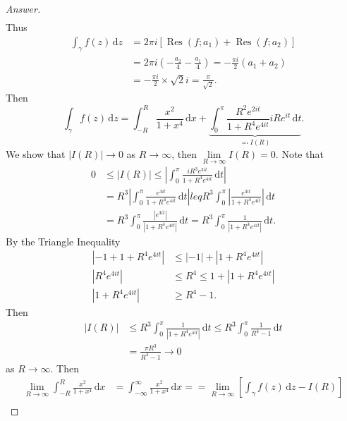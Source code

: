 \documentclass[12pt]{article}
\newcommand\paren[1]{\left( #1 \right)}
\newcommand{\sqbrack}[1]{\left [ #1 \right ]}
\theoremstyle{definition}
\DeclareMathOperator\Res{Res}
\begin{document}
\begin{enumerate}
\begin{proof}[Answer]
\begin{align*}
        \end{align*}
        Thus 
        \begin{align*}
            \int_{\gamma} f(z) \, \mathrm{d}z & = 2\pi i \sqbrack{ \Res(f;a_1) + \Res(f;a_2) } \\
            & = 2\pi i \paren{ -\frac{a_2}{4} - \frac{a_1}{4} } = -\frac{\pi i}{2}(a_1 + a_2) \\
            & = -\frac{\pi i}{2} \times \sqrt{2} i = \frac{\pi}{\sqrt{2}}.
        \end{align*}
        Then 
        \[
            \int_{\gamma} f(z) \, \mathrm{d}z = \int_{-R}^R \frac{x^2}{1+x^4} \, \mathrm{d}x + \underbrace{ \int_0^{\pi} \frac{ R^2 e^{2it} }{ 1 + R^4 e^{4it} } iRe^{it} \, \mathrm{d}t }_{ \eqqcolon I(R) }.
        \]
        We show that $|I(R)| \to 0$ as $R \to \infty$, then $\lim\limits_{R \to \infty} I(R) = 0$. Note that 
        \begin{align*}
            0 & \leq |I(R)| \leq \left| \int_0^{\pi} \frac{ iR^3 e^{3it} }{ 1 + R^4 e^{4it} } \, \mathrm{d}t \right| \\
            & = R^3 \left| \int_0^{\pi} \frac{ e^{3it} }{ 1 + R^4 e^{4it} } \, \mathrm{d}t \right| leq R^3 \int_0^{\pi} \left|  \frac{ e^{3it} }{ 1 + R^4 e^{4it} } \right| \, \mathrm{d}t \\
            & = R^3 \int_0^{\pi} \frac{ |e^{3it}| }{ |1 + R^4 e^{4it}| } \, \mathrm{d}t = R^3 \int_0^{\pi} \frac{ 1 }{ |1 + R^4 e^{4it}| } \, \mathrm{d}t.
        \end{align*}
        By the Triangle Inequality
        \begin{align*}
            \left| -1 + 1 + R^4e^{4it} \right| & \leq |-1| + \left| 1 + R^4e^{4it} \right| \\
            \left| R^4e^{4it} \right| & \leq R^4 \leq 1 + \left| 1 + R^4e^{4it} \right| \\ 
            \left| 1 + R^4e^{4it} \right| & \geq R^4 - 1.
        \end{align*}
        Then 
        \begin{align*}
            |I(R)| & \leq R^3 \int_0^{\pi} \frac{ 1 }{ |1 + R^4 e^{4it}| } \, \mathrm{d}t \leq R^3 \int_0^{\pi} \frac{1}{R^4 - 1} \, \mathrm{d}t \\
            & = \frac{\pi R^3}{R^4 - 1} \to 0
        \end{align*}
        as $R \to \infty$. Then 
        \begin{align*}
            \lim\limits_{R \to \infty} \int_{-R}^R \frac{x^2}{1+x^4} \, \mathrm{d}x & = \int_{-\infty}^{\infty} \frac{x^2}{1+x^4} \, \mathrm{d}x == \lim\limits_{R \to \infty} \sqbrack{ \int_{\gamma} f(z) \, \mathrm{d}z - I(R) } \\

\end{align*}
\end{proof}
\end{enumerate}
\end{document}
